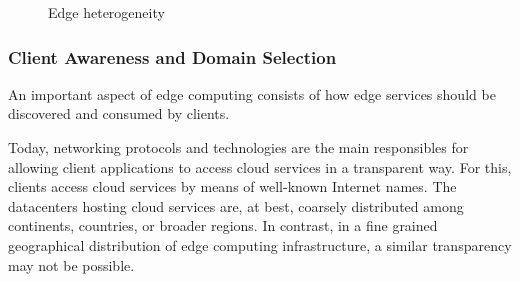 \begin{figure}[tbp]
	\centering
	\captionsetup[subfigure]{width=0.5\textwidth}	
	\null\hfill
	\captionsetup[subfigure]{width=0.45\textwidth}	
	\hfill
	\hfill\null
	\caption{Edge heterogeneity}\label{fig:1}
\end{figure}


\subsubsection{Client Awareness and Domain Selection}

An important aspect of edge computing consists of how edge services should be discovered and consumed by clients. 

Today, networking protocols and technologies are the main responsibles for allowing client applications to access cloud services in a transparent way. For this, clients access cloud services by means of well-known Internet names. The datacenters hosting cloud services are, at best, coarsely distributed among continents, countries, or broader regions. 
In contrast, in a fine grained geographical distribution of edge computing infrastructure, a similar transparency may not be possible. 

